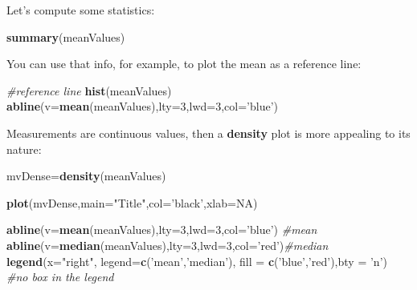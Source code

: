 \documentclass[]{article}
\newenvironment{Shaded}{\begin{snugshade}}{\end{snugshade}}
\newcommand{\KeywordTok}[1]{\textcolor[rgb]{0.13,0.29,0.53}{\textbf{#1}}}
\newcommand{\DataTypeTok}[1]{\textcolor[rgb]{0.13,0.29,0.53}{#1}}
\newcommand{\DecValTok}[1]{\textcolor[rgb]{0.00,0.00,0.81}{#1}}
\newcommand{\StringTok}[1]{\textcolor[rgb]{0.31,0.60,0.02}{#1}}
\newcommand{\CommentTok}[1]{\textcolor[rgb]{0.56,0.35,0.01}{\textit{#1}}}
\newcommand{\OtherTok}[1]{\textcolor[rgb]{0.56,0.35,0.01}{#1}}
\newcommand{\NormalTok}[1]{#1}
\begin{document}
Let's compute some statistics:

\begin{Shaded}
\begin{Highlighting}[]
\KeywordTok{summary}\NormalTok{(meanValues)}
\end{Highlighting}
\end{Shaded}

You can use that info, for example, to plot the mean as a reference
line:

\begin{Shaded}
\begin{Highlighting}[]
\CommentTok{#reference line}
\KeywordTok{hist}\NormalTok{(meanValues)}
\KeywordTok{abline}\NormalTok{(}\DataTypeTok{v=}\KeywordTok{mean}\NormalTok{(meanValues),}\DataTypeTok{lty=}\DecValTok{3}\NormalTok{,}\DataTypeTok{lwd=}\DecValTok{3}\NormalTok{,}\DataTypeTok{col=}\StringTok{'blue'}\NormalTok{)}
\end{Highlighting}
\end{Shaded}

Measurements are continuous values, then a \textbf{density} plot is more
appealing to its nature:

\begin{Shaded}
\begin{Highlighting}[]
\NormalTok{mvDense=}\KeywordTok{density}\NormalTok{(meanValues)}

\KeywordTok{plot}\NormalTok{(mvDense,}\DataTypeTok{main=}\StringTok{"Title"}\NormalTok{,}\DataTypeTok{col=}\StringTok{'black'}\NormalTok{,}\DataTypeTok{xlab=}\OtherTok{NA}\NormalTok{)}

\KeywordTok{abline}\NormalTok{(}\DataTypeTok{v=}\KeywordTok{mean}\NormalTok{(meanValues),}\DataTypeTok{lty=}\DecValTok{3}\NormalTok{,}\DataTypeTok{lwd=}\DecValTok{3}\NormalTok{,}\DataTypeTok{col=}\StringTok{'blue'}\NormalTok{) }\CommentTok{#mean}
\KeywordTok{abline}\NormalTok{(}\DataTypeTok{v=}\KeywordTok{median}\NormalTok{(meanValues),}\DataTypeTok{lty=}\DecValTok{3}\NormalTok{,}\DataTypeTok{lwd=}\DecValTok{3}\NormalTok{,}\DataTypeTok{col=}\StringTok{'red'}\NormalTok{)}\CommentTok{#median}
\KeywordTok{legend}\NormalTok{(}\DataTypeTok{x=}\StringTok{"right"}\NormalTok{,}
       \DataTypeTok{legend=}\KeywordTok{c}\NormalTok{(}\StringTok{'mean'}\NormalTok{,}\StringTok{'median'}\NormalTok{),}
       \DataTypeTok{fill =} \KeywordTok{c}\NormalTok{(}\StringTok{'blue'}\NormalTok{,}\StringTok{'red'}\NormalTok{),}\DataTypeTok{bty =} \StringTok{'n'}\NormalTok{) }\CommentTok{#no box in the legend}
\end{Highlighting}
\end{Shaded}
\end{document}
